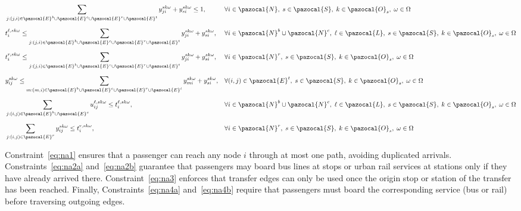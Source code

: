\documentclass[3p,times,procedia]{elsarticle}
\begin{document}
\begin{align}
& \sum_{j:(j,i) \in \pazocal{E}^b \cup \pazocal{E}^c \cup \pazocal{E}^r \cup \pazocal{E}^t} y_{ji}^{sk\omega} + y_{si}^{sk\omega} \leq 1, 
&& \forall i \in \pazocal{N},\; s \in \pazocal{S},\; k \in \pazocal{O}_s,\; \omega \in \Omega 
\label{eq:na1} \\[6pt]
& t_{i}^{\ell,sk\omega} \leq \sum_{j:(j,i) \in \pazocal{E}^b \cup \pazocal{E}^c \cup \pazocal{E}^r \cup \pazocal{E}^t} y_{ji}^{sk\omega} + y_{si}^{sk\omega}, 
&& \forall i \in \pazocal{N}^b \cup \pazocal{N}^c,\; \ell \in \pazocal{L},\; s \in \pazocal{S},\; k \in \pazocal{O}_s,\; \omega \in \Omega 
\label{eq:na2a} \\[6pt]
& t_{i}^{r,sk\omega} \leq \sum_{j:(j,i) \in \pazocal{E}^b \cup \pazocal{E}^c \cup \pazocal{E}^r \cup \pazocal{E}^t} y_{ji}^{sk\omega} + y_{si}^{sk\omega}, 
&& \forall i \in \pazocal{N}^r,\; s \in \pazocal{S},\; k \in \pazocal{O}_s,\; \omega \in \Omega 
\label{eq:na2b} \\[6pt]
& y_{ij}^{sk\omega} \leq \sum_{m:(m,i) \in \pazocal{E}^b \cup \pazocal{E}^c \cup \pazocal{E}^r \cup \pazocal{E}^t} y_{mi}^{sk\omega} + y_{si}^{sk\omega}, 
&& \forall (i,j) \in \pazocal{E}^t,\; s \in \pazocal{S},\; k \in \pazocal{O}_s,\; \omega \in \Omega 
\label{eq:na3} \\[6pt]
& \sum_{j:(i,j) \in \pazocal{E}^b \cup \pazocal{E}^c} u_{ij}^{\ell,sk\omega} \leq t_{i}^{\ell,sk\omega}, 
&& \forall i \in \pazocal{N}^b \cup \pazocal{N}^c,\; \ell \in \pazocal{L},\; s \in \pazocal{S},\; k \in \pazocal{O}_s,\; \omega \in \Omega 
\label{eq:na4a} \\[6pt]
& \sum_{j:(i,j) \in \pazocal{E}^r} y_{ij}^{sk\omega} \leq t_{i}^{r,sk\omega}, 
&& \forall i \in \pazocal{N}^r,\; s \in \pazocal{S},\; k \in \pazocal{O}_s,\; \omega \in \Omega 
\label{eq:na4b}
\end{align}

Constraint~\eqref{eq:na1} ensures that a passenger can reach any node $i$ through at most one path, avoiding duplicated arrivals.  
Constraints~\eqref{eq:na2a} and~\eqref{eq:na2b} guarantee that passengers may board bus lines at stops or urban rail services at stations only if they have already arrived there.  
Constraint~\eqref{eq:na3} enforces that transfer edges can only be used once the origin stop or station of the transfer has been reached.  
Finally, Constraints~\eqref{eq:na4a} and~\eqref{eq:na4b} require that passengers must board the corresponding service (bus or rail) before traversing outgoing edges.  
\end{document}
